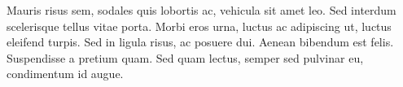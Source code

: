 Mauris risus sem, sodales quis lobortis ac, vehicula sit amet leo. Sed interdum scelerisque tellus vitae porta. Morbi eros urna, luctus ac adipiscing ut, luctus eleifend turpis. Sed in ligula risus, ac posuere dui. Aenean bibendum est felis. Suspendisse a pretium quam. Sed quam lectus, semper sed pulvinar eu, condimentum id augue.~\cite{Doe:2009}


